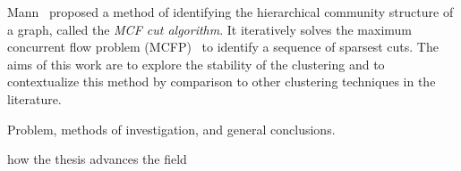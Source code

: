 Mann~\cite{mann2008sparsest} proposed a method of identifying the hierarchical community structure of a graph, called the \emph{MCF cut algorithm}. It iteratively solves the maximum concurrent flow problem (MCFP)~\cite{matula1985concurrent} to identify a sequence of sparsest cuts. The aims of this work are to explore the stability of the clustering and to contextualize this method by comparison to other clustering techniques in the literature.

Problem, methods of investigation, and general conclusions.

how the thesis advances the field
